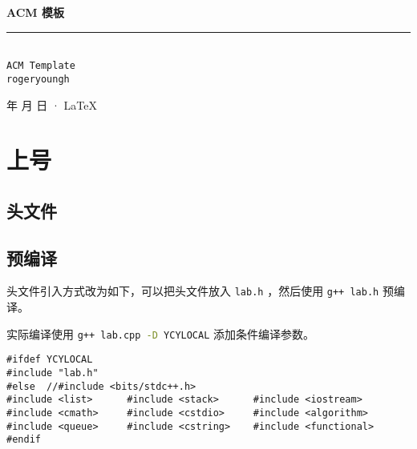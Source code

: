\documentclass[cn,11pt,blue,normal,founder]{elegantbook}
\begin{document}
\newcommand\mfrac[2]{\dfrac{#1\smash[b]{\strut}}{#2\smash[t]{\strut}}}
\newcommand\ee{\mathrm{e}}
\newcommand\dd{\mathrm{d}}
\newcommand\uppi{\mathrm{\pi}}

\begin{titlepage}
	\vspace*{35ex}%
	\begin{minipage}{.9\textwidth}
	\flushright
		{\textbf{ACM 模板}}\\%
		\rule{\linewidth}{1pt}\\ \vspace{2ex}
		{\texttt{ACM Template}} \\%
		\vspace{30ex}%
		{\texttt{rogeryoungh}}%
	\end{minipage}
	\vfill\centering
	{\number\year 年 \number\month 月 \number\day 日 · \LaTeX{}}
\end{titlepage}
\clearpage{\hypersetup{hidelinks}\tableofcontents}

\clearpage

\chapter{上号}

\section{头文件}



\section{预编译}

头文件引入方式改为如下，可以把头文件放入 \lstinline[style=cpp]{lab.h} ，然后使用 \lstinline[language=bash]{g++ lab.h} 预编译。

实际编译使用 \lstinline[language=bash]{g++ lab.cpp -D YCYLOCAL} 添加条件编译参数。

\begin{lstlisting}[style=cpp]
#ifdef YCYLOCAL
#include "lab.h"
#else  //#include <bits/stdc++.h>
#include <list>      #include <stack>      #include <iostream>
#include <cmath>     #include <cstdio>     #include <algorithm>
#include <queue>     #include <cstring>    #include <functional>
#endif
\end{lstlisting}
\end{document}
